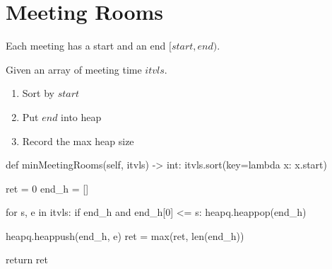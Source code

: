 \section{Meeting Rooms}
Each meeting has a start and an end $[start, end)$. 

 Given an array of meeting time $itvls$.

\begin{enumerate}
\item Sort by $start$
\item Put $end$ into heap
\item Record the max heap size
\end{enumerate}
\begin{python}
def minMeetingRooms(self, itvls) -> int:
  itvls.sort(key=lambda x: x.start)

  ret = 0
  end_h = []

  for s, e in itvls:
    if end_h and end_h[0] <= s:
      heapq.heappop(end_h)

    heapq.heappush(end_h, e)
    ret = max(ret, len(end_h))

  return ret
\end{python}

